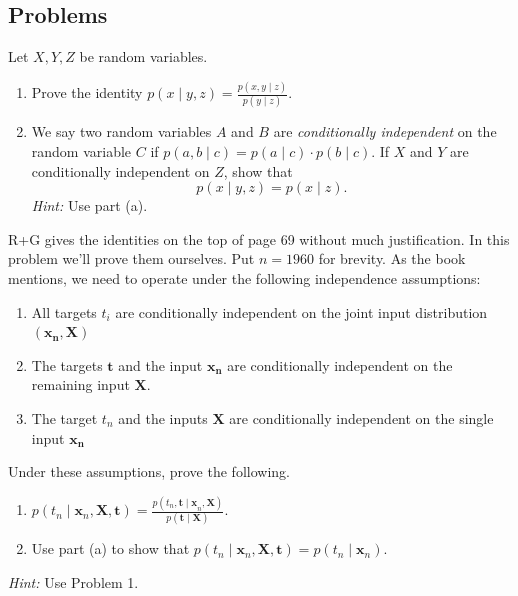 \documentclass{article}
\newenvironment{envsection}[1]{\begin{trivlist}
\item[\hskip \labelsep {\bfseries #1}]}{\end{trivlist}}
\begin{document}
\subsection*{Problems}

\begin{envsection}{Problem 1 (Conditional Probability).}
    Let $X,Y,Z$ be random variables.\vspace{-3pt}
    \begin{enumerate}
        \item[(a)] Prove the identity $\displaystyle p(x \mid y,z) = \frac{p(x,y \mid z)}{p(y \mid z)}$.\vspace{-3pt}
        \item[(b)] We say two random variables $A$ and $B$ are \textit{conditionally independent} on the random variable $C$ if $p(a,b \mid c) = p(a \mid c) \cdot p(b \mid c)$. If $X$ and $Y$ are conditionally independent on $Z$, show that
            \[
            p(x \mid y,z) = p(x \mid z).
            \]
            \textit{Hint:} Use part (a).
    \end{enumerate}
\end{envsection}

\begin{envsection}{Problem 2.}
    R+G gives the identities on the top of page 69 without much justification. In this problem we'll prove them ourselves. Put $n = 1960$ for brevity. As the book mentions, we need to operate under the following independence assumptions:
    \begin{enumerate}
        \item[1.] All targets $t_i$ are conditionally independent on the joint input distribution $(\mathbf{x_n}, \mathbf{X})$
        \item[2.] The targets $\mathbf{t}$ and the input $\mathbf{x_n}$ are conditionally independent on the remaining input $\mathbf{X}$.
        \item[3.] The target $t_n$ and the inputs $\mathbf{X}$ are conditionally independent on the single input $\mathbf{x_n}$
    \end{enumerate}
    Under these assumptions, prove the following.
    \begin{enumerate}
        \item[(a)] $\displaystyle p(t_{n} \mid \mathbf{x}_{n},\mathbf{X, t}) = \frac{p(t_{n}, \mathbf{t \mid x}_{n}, \mathbf{X})}{p(\mathbf{t \mid X})}.$
        \item[(b)] Use part (a) to show that $\displaystyle p(t_{n} \mid \mathbf{x}_{n},\mathbf{X, t}) = p(t_n \mid \mathbf{x}_n).$
    \end{enumerate}
    \textit{Hint:} Use Problem 1.
\end{envsection}
\end{document}
